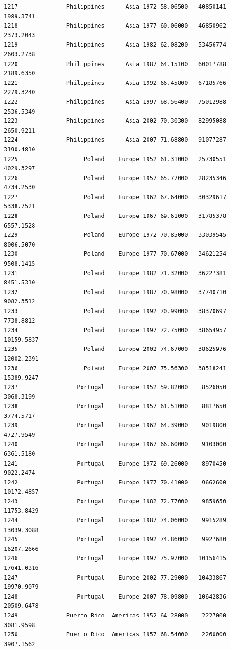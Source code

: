 \documentclass[
  letterpaper,
  DIV=11,
  numbers=noendperiod]{scrreprt}
\begin{document}
\begin{verbatim}
1217              Philippines      Asia 1972 58.06500   40850141   1989.3741
1218              Philippines      Asia 1977 60.06000   46850962   2373.2043
1219              Philippines      Asia 1982 62.08200   53456774   2603.2738
1220              Philippines      Asia 1987 64.15100   60017788   2189.6350
1221              Philippines      Asia 1992 66.45800   67185766   2279.3240
1222              Philippines      Asia 1997 68.56400   75012988   2536.5349
1223              Philippines      Asia 2002 70.30300   82995088   2650.9211
1224              Philippines      Asia 2007 71.68800   91077287   3190.4810
1225                   Poland    Europe 1952 61.31000   25730551   4029.3297
1226                   Poland    Europe 1957 65.77000   28235346   4734.2530
1227                   Poland    Europe 1962 67.64000   30329617   5338.7521
1228                   Poland    Europe 1967 69.61000   31785378   6557.1528
1229                   Poland    Europe 1972 70.85000   33039545   8006.5070
1230                   Poland    Europe 1977 70.67000   34621254   9508.1415
1231                   Poland    Europe 1982 71.32000   36227381   8451.5310
1232                   Poland    Europe 1987 70.98000   37740710   9082.3512
1233                   Poland    Europe 1992 70.99000   38370697   7738.8812
1234                   Poland    Europe 1997 72.75000   38654957  10159.5837
1235                   Poland    Europe 2002 74.67000   38625976  12002.2391
1236                   Poland    Europe 2007 75.56300   38518241  15389.9247
1237                 Portugal    Europe 1952 59.82000    8526050   3068.3199
1238                 Portugal    Europe 1957 61.51000    8817650   3774.5717
1239                 Portugal    Europe 1962 64.39000    9019800   4727.9549
1240                 Portugal    Europe 1967 66.60000    9103000   6361.5180
1241                 Portugal    Europe 1972 69.26000    8970450   9022.2474
1242                 Portugal    Europe 1977 70.41000    9662600  10172.4857
1243                 Portugal    Europe 1982 72.77000    9859650  11753.8429
1244                 Portugal    Europe 1987 74.06000    9915289  13039.3088
1245                 Portugal    Europe 1992 74.86000    9927680  16207.2666
1246                 Portugal    Europe 1997 75.97000   10156415  17641.0316
1247                 Portugal    Europe 2002 77.29000   10433867  19970.9079
1248                 Portugal    Europe 2007 78.09800   10642836  20509.6478
1249              Puerto Rico  Americas 1952 64.28000    2227000   3081.9598
1250              Puerto Rico  Americas 1957 68.54000    2260000   3907.1562

\end{verbatim}
\end{document}
